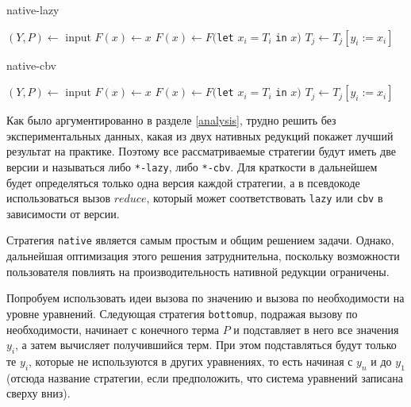 \documentclass[../thesis.tex]{subfiles}
\begin{document}
\begin{megaalgorithm}
    \caption{native-lazy}
  \begin{algorithmic}
    \State $(Y, P)\gets$ input
    \State $F(x) \gets x$
        \State $F(x) \gets F($\texttt{let} $x_i = T_i$ \texttt{in} $x)$
            \State $T_j \gets T_j[y_i := x_i]$
        \EndFor
    \EndFor
    \State {}
  \end{algorithmic}
\end{megaalgorithm}  

\begin{megaalgorithm}
    \caption{native-cbv}
  \begin{algorithmic}
    \State $(Y, P)\gets$ input
    \State $F(x) \gets x$
        \State $F(x) \gets F($\texttt{let} $x_i = T_i$ \texttt{in} $x)$
            \State $T_j \gets T_j[y_i := x_i]$
        \EndFor
    \EndFor
    \State \Return {\textcolor{red}{$cbv(F(P))$}}
  \end{algorithmic}
\end{megaalgorithm}

Как было аргументированно в разделе \ref{analysis}, трудно решить без экспериментальных данных, какая из двух нативных редукций покажет лучший результат на практике. Поэтому все рассматриваемые стратегии будут иметь две версии и называться либо \texttt{*-lazy}, либо \texttt{*-cbv}. Для краткости в дальнейшем будет определяться только одна версия каждой стратегии, а в псевдокоде использоваться вызов $reduce$, который может соответствовать \texttt{lazy} или  \texttt{cbv} в зависимости от версии.

Стратегия \texttt{native} является самым простым и общим решением задачи. Однако, дальнейшая оптимизация этого решения затруднительна, поскольку возможности пользователя повлиять на производительность нативной редукции ограничены.

Попробуем использовать идеи вызова по значению и вызова по необходимости на уровне уравнений. Следующая стратегия \texttt{bottomup}, подражая вызову по необходимости, начинает с конечного терма $P$ и подставляет в него все значения $y_i$, а затем вычисляет получившийся терм. При этом подставляться будут только те $y_i$, которые не используются в других уравнениях, то есть начиная с $y_n$ и до $y_1$ (отсюда название стратегии, если предположить, что система уравнений записана сверху вниз). 
\end{document}
